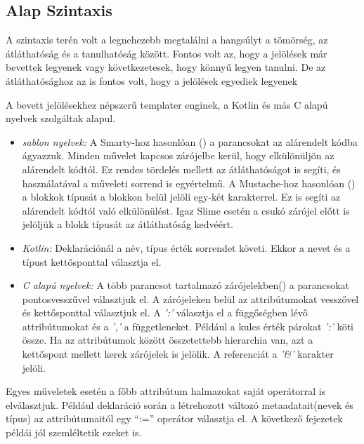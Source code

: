   

\subsection{Alap Szintaxis}
\label{sec:SBaseSyntax}
A szintaxis terén volt a legnehezebb megtalálni a hangsúlyt a tömörség, az átláthatóság és a tanulhatóság között. 
Fontos volt az, hogy a jelölések már bevettek legyenek vagy következetesek, hogy könnyű legyen tanulni. 
De az átláthatósághoz az is fontos volt, hogy a jelölések egyediek legyenek

A bevett jelölésekhez népszerű templater enginek, a Kotlin és más C alapú nyelvek szolgáltak alapul.
\begin{itemize}
\item \emph{sablon nyelvek:}
A Smarty-hoz hasonlóan () a parancsokat az alárendelt kódba ágyazzuk.
Minden művelet kapcsos zárójelbe kerül, hogy elkülönüljön az alárendelt kódtól.
Ez rendes tördelés mellett az átláthatóságot is segíti, és használatával a műveleti sorrend is egyértelmű. 
A Mustache-hoz hasonlóan () a blokkok típusát a blokkon belül jelöli egy-két karakterrel.
Ez is segíti az alárendelt kódtól való elkülönülést.
Igaz Slime esetén a csukó zárójel előtt is jelöljük a blokk típusát az átláthatóság kedvéért.
\item \emph{Kotlin:}
Deklarációnál a név, típus érték sorrendet követi.
Ekkor a nevet és a típust kettősponttal választja el.
\item \emph{C alapú nyelvek:}
A több parancsot tartalmazó zárójelekben() a parancsokat pontosvesszűvel választjuk el.
A zárójeleken belül az attribútumokat vesszővel és kettősponttal választjuk el.
A \textit{':'} választja el a függőségben lévő attribútumokat és a \textit{','} a függetleneket. 
Például a kulcs érték párokat \textit{':'} köti össze.
Ha az attribútumok között összetettebb hierarchia van, azt a kettőspont mellett kerek zárójelek is jelölik. 
A referenciát a \textit{'\&'} karakter jelöli.
\end{itemize} 
Egyes műveletek esetén a főbb attribútum halmazokat saját operátorral is elválasztjuk. 
Például deklaráció során a létrehozott változó metaadatait(nevek és típus) az attribútumaitól egy “:=” operátor választja el.
A következő fejezetek példái jól szemléltetik ezeket is.

